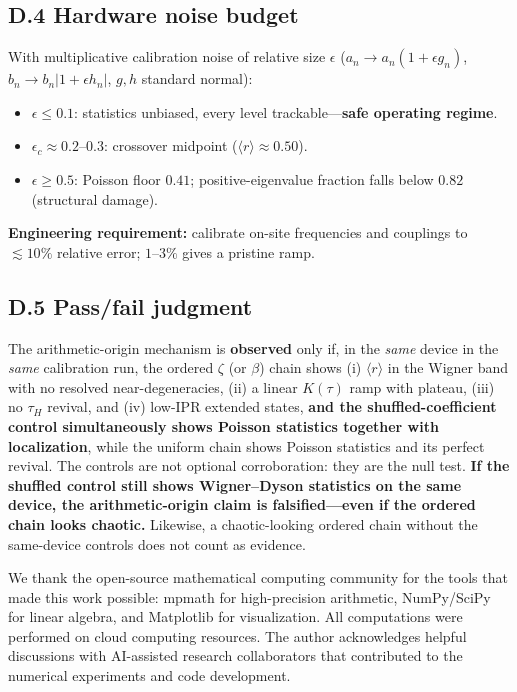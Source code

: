 \documentclass[aps,prx,reprint,floatfix]{revtex4-2}
\begin{document}
\subsection{D.4 Hardware noise budget}
With multiplicative calibration noise of relative size $\epsilon$
($a_n\to a_n(1+\epsilon g_n)$, $b_n\to b_n|1+\epsilon h_n|$, $g,h$ standard
normal):
\begin{itemize}[leftmargin=1.4em]
\item $\epsilon\le0.1$: statistics unbiased, every level trackable---\textbf{safe
operating regime}.
\item $\epsilon_c\approx0.2$--$0.3$: crossover midpoint ($\langle r\rangle
\approx0.50$).
\item $\epsilon\ge0.5$: Poisson floor $0.41$; positive-eigenvalue fraction
falls below $0.82$ (structural damage).
\end{itemize}
\textbf{Engineering requirement:} calibrate on-site frequencies and couplings
to $\lesssim10\%$ relative error; $1$--$3\%$ gives a pristine ramp.

\subsection{D.5 Pass/fail judgment}
The arithmetic-origin mechanism is \textbf{observed} only if, in the
\emph{same} device in the \emph{same} calibration run, the ordered $\zeta$
(or $\beta$) chain shows (i) $\langle r\rangle$ in the Wigner band with no
resolved near-degeneracies, (ii) a linear $K(\tau)$ ramp with plateau,
(iii) no $\tau_H$ revival, and (iv) low-IPR extended states,
\textbf{and the shuffled-coefficient control simultaneously shows Poisson
statistics together with localization}, while the uniform chain shows
Poisson statistics and its perfect revival. The controls are not optional
corroboration: they are the null test. \textbf{If the shuffled control
still shows Wigner--Dyson statistics on the same device, the
arithmetic-origin claim is falsified---even if the ordered chain looks
chaotic.} Likewise, a chaotic-looking ordered chain without the same-device
controls does not count as evidence.

\begin{acknowledgments}
We thank the open-source mathematical computing community for the tools that
made this work possible: mpmath for high-precision arithmetic, NumPy/SciPy for
linear algebra, and Matplotlib for visualization. All computations were
performed on cloud computing resources. The author acknowledges helpful
discussions with AI-assisted research collaborators that contributed to the
numerical experiments and code development.
\end{acknowledgments}
\end{document}
